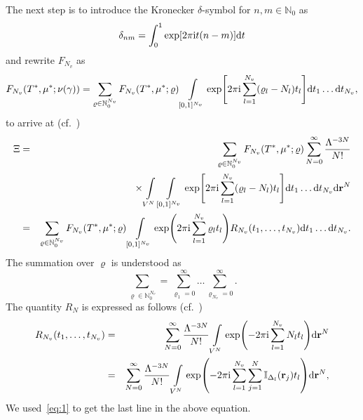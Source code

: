 \documentclass[12pt]{article}
\numberwithin{equation}{section}
\begin{document}
	The next step is to introduce the Kronecker $\delta$-symbol for $n, m \in \mathbb{N}_0$ as
	\begin{equation}
		\label{def:Kronecker}
		\delta_{nm} = \int_0^1 \exp[2\pi {\rm i} t (n-m)] {\rm d}t
	\end{equation}
	and rewrite $F_{N_v}$ as
	\begin{equation}
		F_{N_v}(T^*,\mu^*;\nu(\gamma)) = \sum_{\varrho \in \mathbb{N}_0^{N_v}} F_{N_v}(T^*, \mu^*;\varrho) 
		\int\limits_{[0,1]^{N_v}} \exp[2\pi{\rm i} \sum_{l=1}^{N_v} (\varrho_l - N_l)t_l ] {\rm d} t_1 \ldots {\rm d} t_{N_v},
	\end{equation}
	to arrive at (cf.~\cite[(2.9)]{KKD20})
	\begin{eqnarray}
		\label{eq:XiR}
		\Xi & = &  \sum_{\varrho \in \mathbb{N}_0^{N_v}} F_{N_v}(T^*, \mu^*; \varrho) 
		\sum_{N=0}^{\infty} \frac{\Lambda^{-3N}}{N!} 
		\nonumber\\
		&& \times \int\limits_{V^N} \int\limits_{[0,1]^{N_v}} 
		\exp[2\pi{\rm i} \sum_{l=1}^{N_v} (\varrho_l - N_l)t_l ] {\rm d} t_1 \ldots {\rm d} t_{N_v} {\rm d} \vb{r}^N 
		\nonumber\\
		& = & \sum_{\varrho \in \mathbb{N}_0^{N_v}} F_{N_v}(T^*, \mu^*; \varrho)
		\int\limits_{[0,1]^{N_v}} \exp(2\pi{\rm i} \sum_{l=1}^{N_v} \varrho_l t_l) R_{N_v}(t_1, \ldots, t_{N_v}) {\rm d} t_1 \ldots {\rm d} t_{N_v}.
	\end{eqnarray}
	The summation over $\varrho$ is understood as
	\begin{equation}
		\sum_{\varrho \in \mathbb{N}_0^{N_v}} = \sum_{\varrho_1=0}^{\infty} \ldots \sum_{\varrho_{N_v}=0}^{\infty}.
	\end{equation}
	The quantity $R_N$ is expressed as follows (cf.~\cite[(2.10)]{KKD20})
	\begin{eqnarray}
		\label{def:RN}
		R_{N_v}(t_1, \ldots, t_{N_v}) & = & \sum_{N=0}^{\infty} \frac{\Lambda^{-3N}}{N!} \int\limits_{V^N} \exp(-2\pi{\rm i} \sum_{l=1}^{N_v} N_l t_l) {\rm d} \vb{r}^N
		\nonumber\\
		&=& \sum_{N=0}^{\infty} \frac{\Lambda^{-3N}}{N!} \int\limits_{V^N} \exp(-2\pi{\rm i} \sum_{l=1}^{N_v} \sum_{j=1}^{N} \mathbb{I}_{\Delta_{l}}(\vb{r}_j) t_l) {\rm d} \vb{r}^N,
	\end{eqnarray}
	We used~\eqref{eq:1} to get the last line in the above equation.
	
\end{document}
